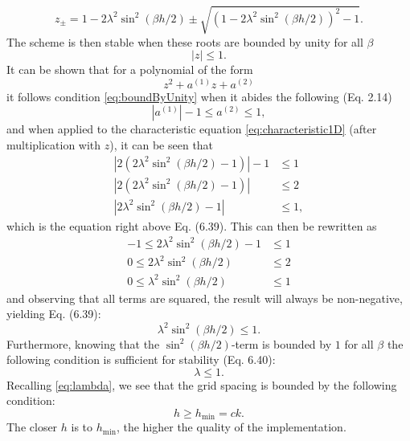 {{\begin{equation}
    z_\pm = 1-2\lambda^2\sin^2(\beta h/2) \pm \sqrt{(1 - 2\lambda^2\sin^2(\beta h/2))^2 - 1}.
\end{equation}
The scheme is then stable when these roots are bounded by unity for all $\beta$ \cite{BilbaoTutorial2018}
\begin{equation}\label{eq:boundByUnity}
    |z| \leq 1.
\end{equation} 
It can be shown that for a polynomial of the form 
\begin{equation}\label{eq:polynomialForm}
    z^2 + a^{(1)}z + a^{(2)}
\end{equation} it follows condition \eqref{eq:boundByUnity} when it abides the following (Eq. 2.14)
\begin{equation}\label{eq:condition214}
    |a^{(1)}| - 1 \leq a^{(2)} \leq 1,
\end{equation}
and when applied to the characteristic equation \eqref{eq:characteristic1D} (after multiplication with $z$), it can be seen that
\begin{equation}\nonumber
    \begin{aligned}
        |2(2\lambda^2\sin^2(\beta h/2) - 1)|-1 &\leq 1\\
        |2(2\lambda^2\sin^2(\beta h/2) - 1)| &\leq 2\\
        |2\lambda^2\sin^2(\beta h/2) - 1| &\leq 1,
    \end{aligned}    
\end{equation}
which is the equation right above Eq. (6.39). This can then be rewritten as
\begin{equation}\nonumber
    \begin{aligned}
        -1 \leq 2\lambda^2\sin^2(\beta h/2) - 1 &\leq 1\\
        0 \leq 2\lambda^2\sin^2(\beta h/2)&\leq 2\\
        0\leq \lambda^2\sin^2(\beta h/2) &\leq 1
    \end{aligned}
\end{equation}
and observing that all terms are squared, the result will always be non-negative, yielding Eq. (6.39):
\begin{equation}
     \lambda^2\sin^2(\beta h/2) \leq 1.
\end{equation}
Furthermore, knowing that the $\sin^2(\beta h / 2)$-term is bounded by $1$ for all $\beta$ the following condition is sufficient for stability (Eq. 6.40):
\begin{equation}
    \lambda \leq 1.
\end{equation}
Recalling \eqref{eq:lambda}, we see that the grid spacing is bounded by the following condition:
\begin{equation}
    h \geq h_\text{min} = ck.
\end{equation}
The closer $h$ is to $h_\text{min}$, the higher the quality of the implementation. 

}}
